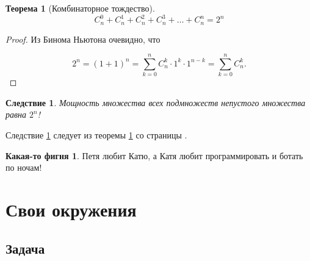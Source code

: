 \documentclass[12pt, a4paper]{article}
\theoremstyle{plain}              %
\newtheorem{theorem}{Теорема}[section]
\newtheorem{result}{Следствие}[theorem]
\theoremstyle{definition}         %
\newtheorem{fignia}{Какая-то фигня}
\begin{document}
\begin{theorem}[Комбинаторное тождество]\label{th:1}
 \[C_n^0 + C_n^1 + C_n^2 + C_n^3 + \ldots + C_n^n = 2^n \]
\end{theorem}
\begin{proof}
Из Бинома Ньютона очевидно, что 

\[ 2^n = (1 + 1)^n = \sum_{k=0}^n C_n^k \cdot 1^k \cdot 1^{n-k} = \sum_{k=0}^n C_n^k. \] 
\end{proof}

\begin{result} \label{sl:11} 
Мощность множества всех подмножеств непустого множества равна $2^n$! 
\end{result}

Следствие \ref{sl:11} следует из теоремы \ref{th:1} со страницы \pageref{th:1}.


\begin{fignia}
	 Петя любит Катю, а Катя любит программировать и ботать по ночам! 
\end{fignia}


\section{Свои окружения} 
\subsection{Задача} 



\newenvironment{exercise}
{ %
\addtocounter{iexer}{1}  %
 { 
   \noindent\ignorespaces   %
   \fontspec{Phorssa} %
   \textcolor{blue}{ \large  \textbf{Задача \arabic{iexer}}} %
 } 
 
\vspace{2mm} %

} %
{ %
\begin{center}
\begin{tikzpicture}
\draw[blue,fill=blue](2,2) circle [radius = 0.3];
\end{tikzpicture}
\end{center}
} %
\end{document}
